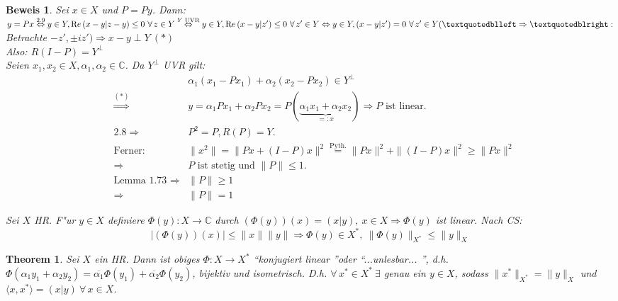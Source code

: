 \documentclass[a4paper,11pt]{book}
\newcommand{\C}{{\mathbb C}}
\newcommand{\re}{\ensuremath{\text Re}\,} %
\def\bewhin{\textquotedblleft\ensuremath{\Rightarrow}\textquotedblright: } %
\newtheorem{Theo}[Def]{Theorem}
\theoremstyle{nonumberplain}
\newtheorem{Bew}{Beweis}
\begin{document}
\begin{Bew}
Sei $x \in X$ und $P = Py$. Dann: $y = Px \stackrel{2.9}{\Leftrightarrow} y \in Y, \re(x-y|z-y) \leq 0 \ \forall\, z \in Y \stackrel{Y \text{ UVR}}{\Leftrightarrow} y \in Y, \re(x-y|z') \leq 0 \ \forall\, z' \in Y \Leftrightarrow y \in Y, (x-y|z') = 0 \ \forall\, z' \in Y (\bewhin$ Betrachte $-z', \pm iz') \Rightarrow x-y \perp Y \ (\ast)$\\
Also: $R(I-P) = Y^{\perp}$\\
Seien $x_1,x_2 \in X, \alpha_1,\alpha_2 \in \C$. Da $Y^{\perp}$ UVR gilt:
\begin{eqnarray*}
& & \alpha_1(x_1-Px_1) + \alpha_2(x_2-Px_2) \in Y^{\perp} \\
& \stackrel{(\ast)}{\Rightarrow} & y = \alpha_1 Px_1 + \alpha_2 Px_2 = P(\underbrace{\alpha_1 x_1 + \alpha_2 x_2}_{=:x}) \Rightarrow P \text{ ist linear.} \\
& 2.8 \Rightarrow & P^2 = P, R(P) = Y. \\
& \text{Ferner:} & \|x^2\| = \|Px + (I-P)x\|^2 \stackrel{\text{Pyth.}}{=} \|Px\|^2 + \|(I-P)x\|^2 \geq \|Px\|^2 \\
& \Rightarrow & P \text{ ist stetig und } \|P\| \leq 1. \\
& \text{Lemma 1.73 } \Rightarrow & \|P\| \geq 1 \\
& \Rightarrow & \|P\| = 1
\end{eqnarray*}

Sei $X$ HR. F"ur $y \in X$ definiere $\Phi(y): X \rightarrow \C$ durch $(\Phi(y))(x) = (x|y), \ x \in X \Rightarrow \Phi(y)$ ist linear. Nach CS:
\[
|\left( \Phi(y) \right) (x) | \leq \|x\| \|y\| \Longrightarrow \Phi(y) \in X^{\ast},\ \|\Phi(y)\|_{X^{\ast}} \leq \|y\|_X
\]
\end{Bew}


\begin{Theo}
Sei $X$ ein HR. Dann ist obiges $\Phi: X \rightarrow X^{\ast}$ \textquotedblleft konjugiert linear \textquotedblright oder \textquotedblleft ...unlesbar... \textquotedblright, d.h. $\Phi(\alpha_1 y_1 + \alpha_2 y_2) = \overline{\alpha_1} \Phi(y_1) + \overline{\alpha_2} \Phi(y_2)$, bijektiv und isometrisch. D.h. $\forall\, x^{\ast} \in X^{\ast} \ \exists$ genau ein $y \in X$, sodass $\|x^{\ast}\|_{X^{\ast}} = \|y\|_X$ und $\langle x,x^{\ast} \rangle = (x|y) \ \forall\, x \in X$.
\end{Theo}
\end{document}
